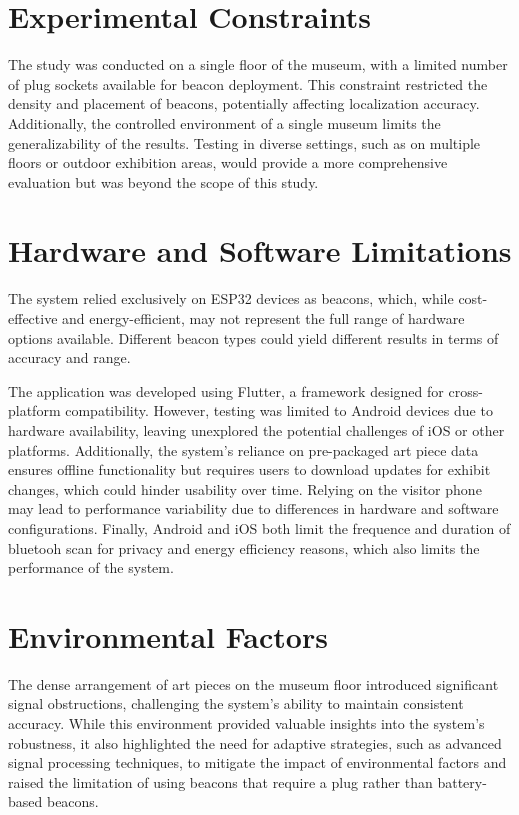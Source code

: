 \section{Experimental Constraints}
The study was conducted on a single floor of the museum, with a limited number of plug sockets available for beacon deployment. This constraint restricted the density and placement of beacons, potentially affecting localization accuracy. Additionally, the controlled environment of a single museum limits the generalizability of the results. Testing in diverse settings, such as on multiple floors or outdoor exhibition areas, would provide a more comprehensive evaluation but was beyond the scope of this study.

\section{Hardware and Software Limitations}
The system relied exclusively on ESP32 devices as beacons, which, while cost-effective and energy-efficient, may not represent the full range of hardware options available. Different beacon types could yield different results in terms of accuracy and range.

The application was developed using Flutter, a framework designed for cross-platform compatibility. However, testing was limited to Android devices due to hardware availability, leaving unexplored the potential challenges of iOS or other platforms. Additionally, the system’s reliance on pre-packaged art piece data ensures offline functionality but requires users to download updates for exhibit changes, which could hinder usability over time. Relying on the visitor phone may lead to performance variability due to differences in hardware and software configurations. Finally, Android and iOS both limit the frequence and duration of bluetooh scan for privacy and energy efficiency reasons, which also limits the performance of the system.

\section{Environmental Factors}
The dense arrangement of art pieces on the museum floor introduced significant signal obstructions, challenging the system’s ability to maintain consistent accuracy. While this environment provided valuable insights into the system’s robustness, it also highlighted the need for adaptive strategies, such as advanced signal processing techniques, to mitigate the impact of environmental factors and raised the limitation of using beacons that require a plug rather than battery-based beacons.

